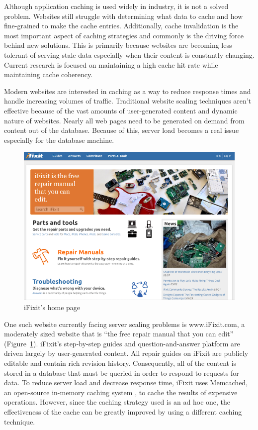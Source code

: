 \documentclass[12pt]{ucthesis}
\begin{document}
Although application caching is used widely in industry, it is not a solved problem.
Websites still struggle with determining what data to cache and how fine-grained to make the cache entries.
Additionally, cache invalidation is the most important aspect of caching strategies and commonly is the driving force behind new solutions.
This is primarily because websites are becoming less tolerant of serving stale data especially when their content is constantly changing.
Current research is focused on maintaining a high cache hit rate while maintaining cache coherency.

Modern websites are interested in caching as a way to reduce response times and handle increasing volumes of traffic.
Traditional website scaling techniques aren't effective because of the vast amounts of user-generated content and dynamic nature of websites.
Nearly all web pages need to be generated on demand from content out of the database.
Because of this, server load becomes a real issue especially for the database machine.

\begin{figure}[h]
\centering
\includegraphics[width=\textwidth]{assets/iFixitHomepage.png}
\caption{iFixit's home page}
\label{fig:iFixitHomePage}
\end{figure}

One such website currently facing server scaling problems is \textsf{www.iFixit.com}, a moderately sized website that is ``the free repair manual that you can edit''\cite{ifixitDotCom} (Figure~\ref{fig:iFixitHomePage}).
\textsf{iFixit}'s step-by-step guides and question-and-answer platform are driven largely by user-generated content.
All repair guides on \textsf{iFixit} are publicly editable and contain rich revision history.
Consequently, all of the content is stored in a database that must be queried in order to respond to requests for data.
To reduce server load and decrease response time, \textsf{iFixit} uses \textsf{Memcached}, an open-source in-memory caching system \cite{memcachedDotOrg}, to cache the results of expensive operations.
However, since the caching strategy used is an ad hoc one, the effectiveness of the cache can be greatly improved by using a different caching technique.
\end{document}
